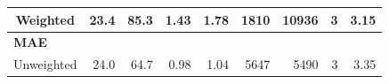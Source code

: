 \documentclass[a4paper,fleqn]{cas-sc}
\begin{document}
\begin{table}[]
\begin{tabular}{crrrrrrrr}
Weighted                                                                                                   & 23.4                                                                                   & 85.3                                                                                        & 1.43                                                                            & 1.78                                                                                          & 1810                                                                                      & 10936                                                                                              & 3                                                                                       & 3.15                                                                                   \\ \hline
\multicolumn{9}{l}{\textbf{MAE}}                                                                                                                                                                                                                                                                                                                                                                                                                                                                                                                                                                                                                                                                                                                                                                                                                                                 \\
Unweighted                                                                                                 & 24.0                                                                                   & 64.7                                                                                        & 0.98                                                                            & 1.04                                                                                          & 5647                                                                                      & 5490                                                                                               & 3                                                                                       & 3.35                                                                                   \\

\end{tabular}
\end{table}
\end{document}
